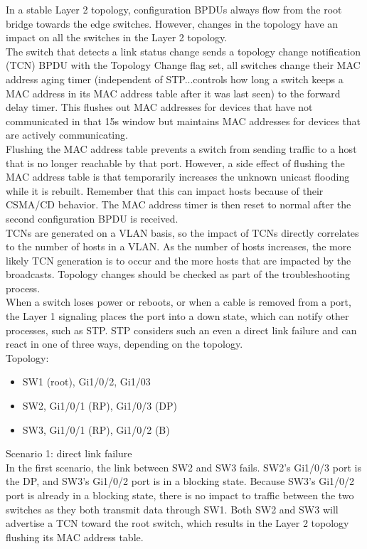 \documentclass{article}
\begin{document}
	In a stable Layer 2 topology, configuration BPDUs always flow from the root bridge towards the edge switches. However, changes in the topology have an impact on all the switches in the Layer 2 topology.\\

	The switch that detects a link status change sends a topology change notification (TCN) BPDU with the Topology Change flag set, all switches change their MAC address aging timer (independent of STP...controls how long a switch keeps a MAC address in its MAC address table after it was last seen) to the forward delay timer. This flushes out MAC addresses for devices that have not communicated in that 15s window but maintains MAC addresses for devices that are actively communicating.\\	

	Flushing the MAC address table prevents a switch from sending traffic to a host that is no longer reachable by that port. However, a side effect of flushing the MAC address table is that temporarily increases the unknown unicast flooding while it is rebuilt. Remember that this can impact hosts because of their CSMA/CD behavior. The MAC address timer is then reset to normal after the second configuration BPDU is received.\\

	TCNs are generated on a VLAN basis, so the impact of TCNs directly correlates to the number of hosts in a VLAN. As the number of hosts increases, the more likely TCN generation is to occur and the more hosts that are impacted by the broadcasts. Topology changes should be checked as part of the troubleshooting process.\\

	When a switch loses power or reboots, or when a cable is removed from a port, the Layer 1 signaling places the port into a down state, which can notify other processes, such as STP. STP considers such an even a direct link failure and can react in one of three ways, depending on the topology.\\

	Topology:
		\begin{itemize}
			\item SW1 (root), Gi1/0/2, Gi1/03
			\item SW2, Gi1/0/1 (RP), Gi1/0/3 (DP)
			\item SW3, Gi1/0/1 (RP), Gi1/0/2 (B)
		\end{itemize}

	Scenario 1: direct link failure\\
		In the first scenario, the link between SW2 and SW3 fails. SW2's Gi1/0/3 port is the DP, and SW3's Gi1/0/2 port is in a blocking state. Because SW3's Gi1/0/2 port is already in a blocking state, there is no impact to traffic between the two switches as they both transmit data through SW1. Both SW2 and SW3 will advertise a TCN toward the root switch, which results in the Layer 2 topology flushing its MAC address table.	
\end{document}
